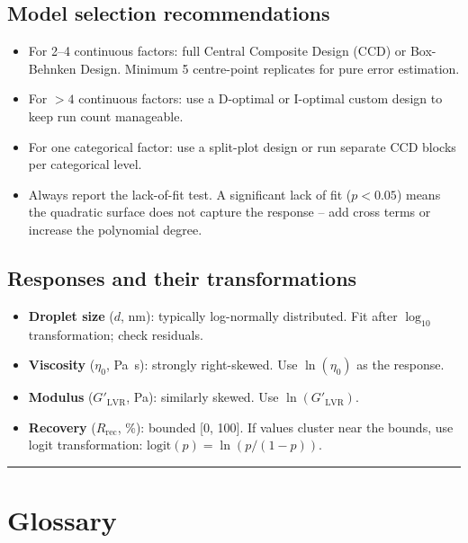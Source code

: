 \documentclass[11pt,a4paper]{article}
\begin{document}
\subsection{Model selection recommendations}

\begin{itemize}[leftmargin=1.6em,itemsep=3pt]
\item For 2--4 continuous factors: full Central Composite Design (CCD)
  or Box-Behnken Design. Minimum 5 centre-point replicates for pure
  error estimation.
\item For $>4$ continuous factors: use a D-optimal or I-optimal custom
  design to keep run count manageable.
\item For one categorical factor: use a split-plot design or run separate
  CCD blocks per categorical level.
\item Always report the lack-of-fit test. A significant lack of fit
  ($p<0.05$) means the quadratic surface does not capture the response
  -- add cross terms or increase the polynomial degree.
\end{itemize}

\subsection{Responses and their transformations}

\begin{itemize}[leftmargin=1.6em,itemsep=2pt]
\item \textbf{Droplet size} ($d$, nm): typically log-normally distributed.
  Fit after $\log_{10}$ transformation; check residuals.
\item \textbf{Viscosity} ($\eta_0$, \si{\Pa\s}): strongly right-skewed.
  Use $\ln(\eta_0)$ as the response.
\item \textbf{Modulus} ($G'_\mathrm{LVR}$, \si{\Pa}): similarly skewed.
  Use $\ln(G'_\mathrm{LVR})$.
\item \textbf{Recovery} ($R_\mathrm{rec}$, \%): bounded [0, 100].
  If values cluster near the bounds, use logit transformation:
  $\mathrm{logit}(p)=\ln(p/(1-p))$.
\end{itemize}

\bigskip\hrule\bigskip

\appendix

\section{Glossary}
\label{app:glossary}
\end{document}
